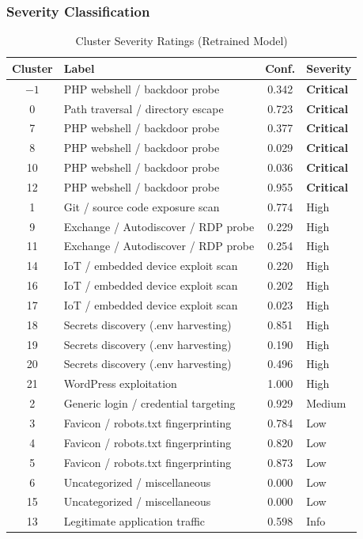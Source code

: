 \documentclass[12pt, a4paper]{report}   %
\begin{document}
\subsubsection{Severity Classification}

\begin{table}[H]
  \centering
  \caption{Cluster Severity Ratings (Retrained Model)}
  \label{tab:severity}
  \small
  \begin{tabularx}{\textwidth}{cXcX}
    \toprule
    \textbf{Cluster} & \textbf{Label} & \textbf{Conf.} & \textbf{Severity} \\
    \midrule
    $-1$ & PHP webshell / backdoor probe      & 0.342 & \textbf{Critical} \\
      0  & Path traversal / directory escape  & 0.723 & \textbf{Critical} \\
      7  & PHP webshell / backdoor probe      & 0.377 & \textbf{Critical} \\
      8  & PHP webshell / backdoor probe      & 0.029 & \textbf{Critical} \\
     10  & PHP webshell / backdoor probe      & 0.036 & \textbf{Critical} \\
     12  & PHP webshell / backdoor probe      & 0.955 & \textbf{Critical} \\
      1  & Git / source code exposure scan    & 0.774 & High \\
      9  & Exchange / Autodiscover / RDP probe & 0.229 & High \\
     11  & Exchange / Autodiscover / RDP probe & 0.254 & High \\
     14  & IoT / embedded device exploit scan & 0.220 & High \\
     16  & IoT / embedded device exploit scan & 0.202 & High \\
     17  & IoT / embedded device exploit scan & 0.023 & High \\
     18  & Secrets discovery (.env harvesting) & 0.851 & High \\
     19  & Secrets discovery (.env harvesting) & 0.190 & High \\
     20  & Secrets discovery (.env harvesting) & 0.496 & High \\
     21  & WordPress exploitation              & 1.000 & High \\
      2  & Generic login / credential targeting & 0.929 & Medium \\
      3  & Favicon / robots.txt fingerprinting & 0.784 & Low \\
      4  & Favicon / robots.txt fingerprinting & 0.820 & Low \\
      5  & Favicon / robots.txt fingerprinting & 0.873 & Low \\
      6  & Uncategorized / miscellaneous       & 0.000 & Low \\
     15  & Uncategorized / miscellaneous       & 0.000 & Low \\
     13  & Legitimate application traffic      & 0.598 & Info \\
    \bottomrule
  \end{tabularx}
\end{table}
\end{document}
